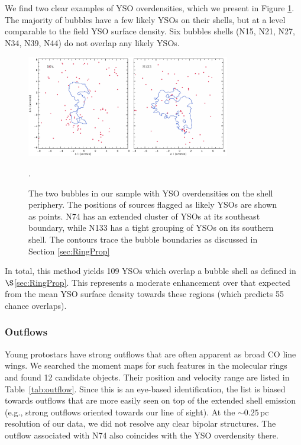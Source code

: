 We find two clear examples of YSO overdensities, which we present in Figure \ref{fig:yso}.
The majority of bubbles have a few likely YSOs on their shells, but at a level comparable
to the field YSO surface density. Six bubbles shells (N15, N21, N27, N34, N39, N44)
do not overlap any likely YSOs.

\begin{figure}
\centering
\includegraphics[width= 3.5in]{ysos2}
\caption{
The two bubbles in our sample with YSO overdensities on the shell periphery. The positions of sources flagged as likely YSOs are
shown as points. N74 has an extended cluster of
YSOs at its southeast boundary, while N133 has a tight grouping of YSOs on its southern shell. The contours trace
the bubble boundaries as discussed in Section \ref{sec:RingProp}}.
\label{fig:yso}
\end{figure}



In total, this method yields 109 YSOs which overlap a bubble shell as defined in
$\S$\ref{sec:RingProp}. This represents a moderate enhancement over that expected from
the mean YSO surface density towards these regions (which predicts 55 chance overlaps).


\subsubsection{Outflows}
Young protostars have strong outflows that are often apparent as broad
CO line wings. We searched the moment maps for such features in the
molecular rings and found 12 candidate objects.  Their position and
velocity range are listed in Table~\ref{tab:outflow}.  Since this is
an eye-based identification, the list is biased towards outflows that
are more easily seen on top of the extended shell emission (e.g.,
strong outflows oriented towards our line of sight). At the $\sim
0.25$\,pc resolution of our data, we did not resolve any clear bipolar
structures. The outflow associated with N74 also coincides with the YSO
overdensity there.

